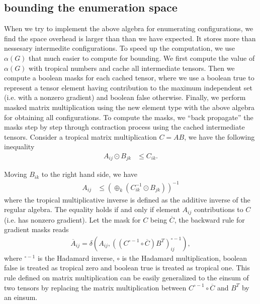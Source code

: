 \documentclass{article}
\newcommand{\<}{\langle}
\renewcommand{\>}{\rangle}
\theoremstyle{definition}\newtheorem{definition}{\textit{Definition}}
\begin{document}
\subsection{bounding the enumeration space}
When we try to implement the above algebra for enumerating configurations, we find the space overhead is larger than than we have expected.
It stores more than nessesary intermedite configurations. To speed up the computation, we use $\alpha(G)$ that much easier to compute for bounding.
We first compute the value of $\alpha(G)$ with tropical numbers and cache all intermediate tensors.
Then we compute a boolean masks for each cached tensor, where we use a boolean true to represent a tensor element having contribution to the maximum independent set (i.e. with a nonzero gradient) and boolean false otherwise.
Finally, we perform masked matrix multiplication using the new element type with the above algebra for obtaining all configurations.
To compute the masks, we ``back propagate'' the masks step by step through contraction process using the cached intermediate tensors.
Consider a tropical matrix multiplication $C = A B$, we have the following inequality
\begin{align}
    A_{ij} \odot B_{jk} &\leq C_{ik}.
\end{align}

Moving $B_{ik}$ to the right hand side, we have
\begin{align}
    A_{ij} &\leq (\oplus_{k} (C_{ik}^{-1} \odot B_{jk}))^{-1}
\end{align}
where the tropical multiplicative inverse is defined as the additive inverse of the regular algebra. The equality holds if and only if element $A_{ij}$ contributions to $C$ (i.e. has nonzero gradient).
Let the mask for $C$ being $\overline C$, the backward rule for gradient masks reads
\begin{align}
\overline{A}_{ij} = \delta(A_{ij}, ((C^{\circ-1} \circ \overline C )B^T)_{ij}^{\circ -1}),
\end{align}
where ${}^{\circ -1}$ is the Hadamard inverse, $\circ$ is the Hadamard multiplication, boolean false is treated as tropical zero and boolean true is treated as tropical one.
This rule defined on matrix multiplication can be easily generalized to the einsum of two tensors by replacing the matrix multiplication between $C^{\circ-1} \circ \overline C$ and $B^T$ by an einsum.
\end{document}
